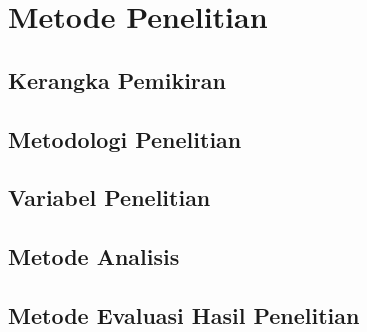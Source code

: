 \chapter{Metode Penelitian}

\section{Kerangka Pemikiran}

\section{Metodologi Penelitian}

\section{Variabel Penelitian}

\section{Metode Analisis}

\section{Metode Evaluasi Hasil Penelitian}